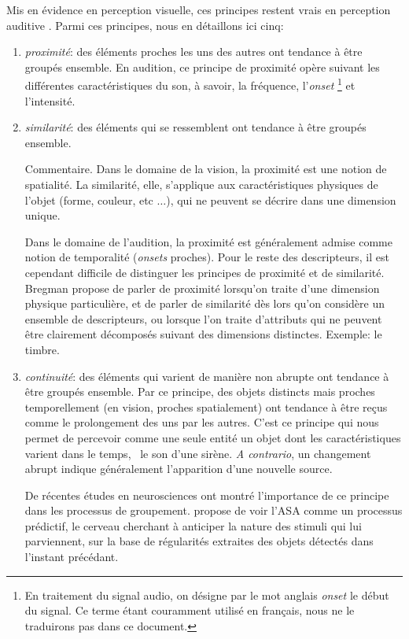 {Mis en évidence en perception visuelle, ces principes restent vrais en perception auditive \citep[ch. 1]{bregman1994auditory}. Parmi ces principes, nous en détaillons ici cinq:

\begin{enumerate}
\item \emph{proximité}: des éléments proches les uns des autres ont tendance à être groupés ensemble. En audition, ce principe de proximité opère suivant les différentes caractéristiques du son, à savoir, la fréquence, l'\emph{onset} \footnote{En traitement du signal audio, on désigne par le mot anglais \emph{onset} le début du signal. Ce terme étant couramment utilisé en français, nous ne le traduirons pas dans ce document.} et l'intensité.
 
\item \emph{similarité}: des éléments qui se ressemblent ont tendance à être groupés ensemble. 

Commentaire. Dans le domaine de la vision, la proximité est une notion de spatialité. La similarité, elle, s'applique aux caractéristiques physiques de l'objet (forme, couleur, etc $\ldots$), qui ne peuvent se décrire dans une dimension unique. 

Dans le domaine de l'audition, la proximité est généralement admise comme notion de temporalité (\emph{onsets} proches). Pour le reste des descripteurs, il est cependant difficile de distinguer les principes de proximité et de similarité. Bregman propose de parler de proximité lorsqu'on traite d'une dimension physique particulière, et de parler de similarité dès lors qu'on considère un ensemble de descripteurs, ou lorsque l'on traite d'attributs qui ne peuvent être clairement décomposés suivant des dimensions distinctes. Exemple: le timbre.

\item \emph{continuité}: des éléments qui varient de manière non abrupte ont tendance à être groupés ensemble. Par ce principe, des objets distincts mais proches temporellement (en vision, proches spatialement) ont tendance à être reçus comme le prolongement des uns par les autres. C'est ce principe qui nous permet de percevoir comme une seule entité un objet dont les caractéristiques varient dans le temps, \eg~le son d'une sirène. \emph{A contrario}, un changement abrupt indique généralement l'apparition d'une nouvelle source.

De récentes études en neurosciences ont montré l'importance de ce principe dans les processus de groupement. \citep{winkler2009modeling}  propose de voir l'ASA comme un processus prédictif, le cerveau cherchant à anticiper la nature des stimuli qui lui parviennent, sur la base de régularités extraites des objets détectés dans l'instant précédant.


\end{enumerate}}
